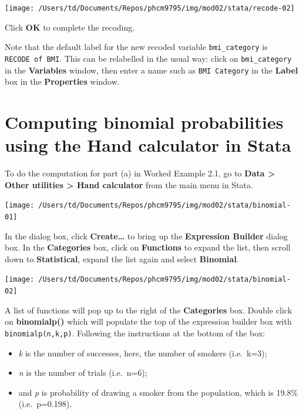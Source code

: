 \documentclass[
]{memoir}
\providecommand{\tightlist}{%
  \setlength{\itemsep}{0pt}\setlength{\parskip}{0pt}}
\begin{document}
\texttt{[image: /Users/td/Documents/Repos/phcm9795/img/mod02/stata/recode-02]}

Click \textbf{OK} to complete the recoding.

Note that the default label for the new recoded variable \texttt{bmi\_category} is \texttt{RECODE\ of\ BMI}. This can be relabelled in the usual way: click on \texttt{bmi\_category} in the \textbf{Variables} window, then enter a name such as \texttt{BMI\ Category} in the \textbf{Label} box in the \textbf{Properties} window.

\hypertarget{computing-binomial-probabilities-using-the-hand-calculator-in-stata}{%
\section{Computing binomial probabilities using the Hand calculator in Stata}\label{computing-binomial-probabilities-using-the-hand-calculator-in-stata}}

To do the computation for part (a) in Worked Example 2.1, go to \textbf{Data \textgreater{} Other utilities \textgreater{} Hand calculator} from the main menu in Stata.

\texttt{[image: /Users/td/Documents/Repos/phcm9795/img/mod02/stata/binomial-01]}

In the dialog box, click \textbf{Create\ldots{}} to bring up the \textbf{Expression Builder} dialog box. In the \textbf{Categories} box, click on \textbf{Functions} to expand the list, then scroll down to \textbf{Statistical}, expand the list again and select \textbf{Binomial}.

\texttt{[image: /Users/td/Documents/Repos/phcm9795/img/mod02/stata/binomial-02]}

A list of functions will pop up to the right of the \textbf{Categories} box. Double click on \textbf{binomialp()} which will populate the top of the expression builder box with \texttt{binomialp(n,k,p)}. Following the instructions at the bottom of the box:

\begin{itemize}
\tightlist
\item
  \emph{k} is the number of successes, here, the number of smokers (i.e.~k=3);
\item
  \emph{n} is the number of trials (i.e.~n=6);
\item
  and \emph{p} is probability of drawing a smoker from the population, which is 19.8\% (i.e.~p=0.198).
\end{itemize}
\end{document}
